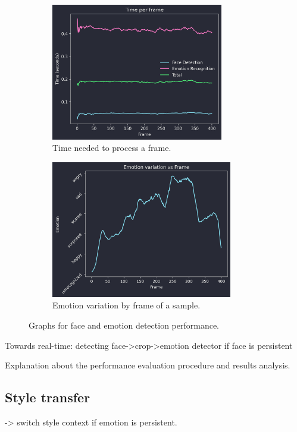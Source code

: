 \begin{figure}[h]
    \centering
       \begin{subfigure}{0.49\linewidth} \centering
         \includegraphics[height = 6cm]{resources/face_emo_time_series.png}
         \caption{Time needed to process a frame.}\label{fig:timeseriesplot}
       \end{subfigure}
       \begin{subfigure}{0.49\linewidth} \centering
         \includegraphics[height = 6cm]{resources/emotionvsframe.png}
         \caption{Emotion variation by frame of a sample.}\label{fig:emotionvsframe}
       \end{subfigure}
    \caption{Graphs for face and emotion detection performance.} \label{fig:emotionandtime}
    \end{figure}
  
Towards real-time: detecting face->crop->emotion detector if face is persistent 

Explanation about the performance evaluation procedure and results analysis.


\subsection{Style transfer}

-> switch style context if emotion is persistent.



